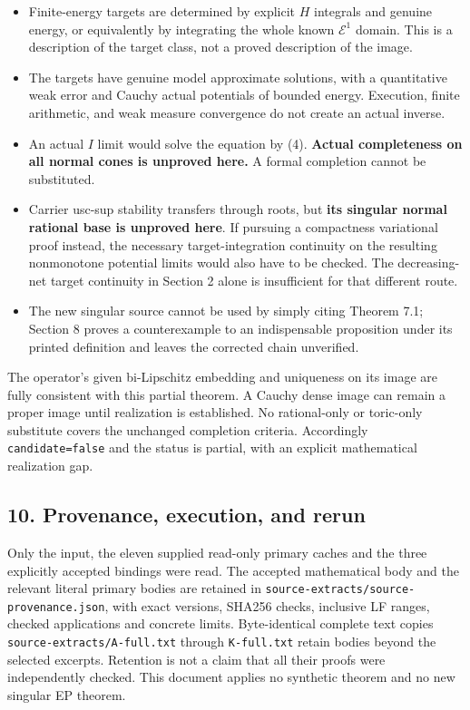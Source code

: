 \documentclass[
  10pt,
]{article}
\providecommand{\tightlist}{%
  \setlength{\itemsep}{0pt}\setlength{\parskip}{0pt}}
\begin{document}
\begin{itemize}
\tightlist
\item
  Finite-energy targets are determined by explicit \(H\) integrals and
  genuine energy, or equivalently by integrating the whole known
  \(\mathcal E^1\) domain. This is a description of the target class,
  not a proved description of the image.
\item
  The targets have genuine model approximate solutions, with a
  quantitative weak error and Cauchy actual potentials of bounded
  energy. Execution, finite arithmetic, and weak measure convergence do
  not create an actual inverse.
\item
  An actual \(I\) limit would solve the equation by (4). \textbf{Actual
  completeness on all normal cones is unproved here.} A formal
  completion cannot be substituted.
\item
  Carrier usc-sup stability transfers through roots, but \textbf{its
  singular normal rational base is unproved here}. If pursuing a
  compactness variational proof instead, the necessary
  target-integration continuity on the resulting nonmonotone potential
  limits would also have to be checked. The decreasing-net target
  continuity in Section 2 alone is insufficient for that different
  route.
\item
  The new singular source cannot be used by simply citing Theorem 7.1;
  Section 8 proves a counterexample to an indispensable proposition
  under its printed definition and leaves the corrected chain
  unverified.
\end{itemize}

The operator's given bi-Lipschitz embedding and uniqueness on its image
are fully consistent with this partial theorem. A Cauchy dense image can
remain a proper image until realization is established. No rational-only
or toric-only substitute covers the unchanged completion criteria.
Accordingly \texttt{candidate=false} and the status is partial, with an
explicit mathematical realization gap.

\subsection{10. Provenance, execution, and
rerun}\label{provenance-execution-and-rerun}

Only the input, the eleven supplied read-only primary caches and the
three explicitly accepted bindings were read. The accepted mathematical
body and the relevant literal primary bodies are retained in
\texttt{source-extracts/source-provenance.json}, with exact versions,
SHA256 checks, inclusive LF ranges, checked applications and concrete
limits. Byte-identical complete text copies
\texttt{source-extracts/A-full.txt} through \texttt{K-full.txt} retain
bodies beyond the selected excerpts. Retention is not a claim that all
their proofs were independently checked. This document applies no
synthetic theorem and no new singular EP theorem.
\end{document}

